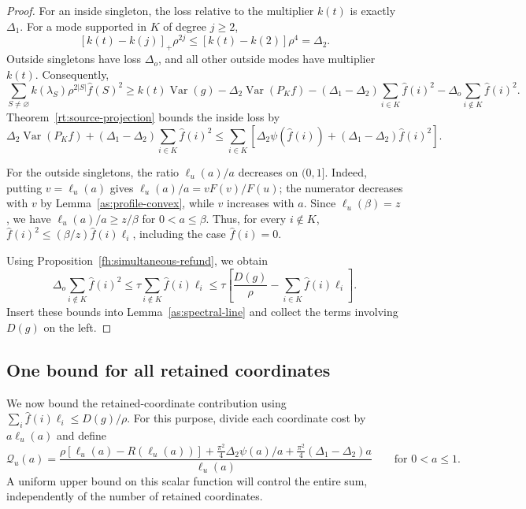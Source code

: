 \documentclass[11pt,letterpaper]{amsart}
\newcommand{\1}{\mathbf 1}
\DeclareMathOperator{\Var}{Var}
\numberwithin{equation}{section}
\begin{document}
\begin{proof}
For an inside singleton, the loss relative to the multiplier
$k(t)$ is exactly $\Delta_1$.
For a mode supported in $K$ of degree $j\ge2$,
\[
 [k(t)-k(j)]_+\rho^{2j}
 \le[k(t)-k(2)]\rho^4=\Delta_2.
\]
Outside singletons have loss $\Delta_o$, and all other
outside modes have multiplier $k(t)$.
Consequently,
\[
 \sum_{S\ne\varnothing}
   k(\lambda_S)\rho^{2|S|}\widehat f(S)^2
 \ge k(t)\Var(g)-\Delta_2\Var(P_Kf)-(\Delta_1-\Delta_2)
       \sum_{i\in K}\widehat f(i)^2
   -\Delta_o\sum_{i\notin K}\widehat f(i)^2.
\]
Theorem~\ref{rt:source-projection} bounds the inside loss by
\[
\Delta_2\Var(P_Kf)
   +(\Delta_1-\Delta_2)\sum_{i\in K}\widehat f(i)^2\le
 \sum_{i\in K}
 \left[
   \Delta_2\psi(\widehat f(i))
   +(\Delta_1-\Delta_2)\widehat f(i)^2
 \right].
\]

For the outside singletons, the ratio $\ell_u(a)/a$ decreases
on $(0,1]$.
Indeed, putting $v=\ell_u(a)$ gives
$\ell_u(a)/a=vF(v)/F(u)$; the numerator decreases with $v$
by Lemma~\ref{as:profile-convex}, while $v$ increases with $a$.
Since $\ell_u(\beta)=z$, we have
$\ell_u(a)/a\ge z/\beta$ for $0<a\le\beta$.
Thus, for every $i\notin K$,
$\widehat f(i)^2\le(\beta/z)\widehat f(i)\ell_i$,
including the case $\widehat f(i)=0$.

Using Proposition~\ref{fh:simultaneous-refund}, we obtain
\[
 \Delta_o\sum_{i\notin K}\widehat f(i)^2
\le\tau\sum_{i\notin K}\widehat f(i)\ell_i\le\tau\left[
       \frac{D(g)}{\rho}
       -\sum_{i\in K}\widehat f(i)\ell_i
       \right].
\]
Insert these bounds into Lemma~\ref{as:spectral-line}
and collect the terms involving $D(g)$ on the left.
\end{proof}

\subsection{One bound for all retained coordinates}

We now bound the retained-coordinate contribution using
$\sum_i\widehat f(i)\ell_i\le D(g)/\rho$.
For this purpose, divide each coordinate cost by
$a\ell_u(a)$ and define
\begin{equation}\label{eq:spectral-cost}
 \mathcal Q_u(a)=
 \frac{\rho[\ell_u(a)-R(\ell_u(a))]
       +\frac{\pi^2}{4}\Delta_2\psi(a)/a
       +\frac{\pi^2}{4}(\Delta_1-\Delta_2)a}
      {\ell_u(a)}
 \qquad \text{for } 0<a\le 1.
\end{equation}
A uniform upper bound on this scalar function will control
the entire sum, independently of the number of retained coordinates.
\end{document}
